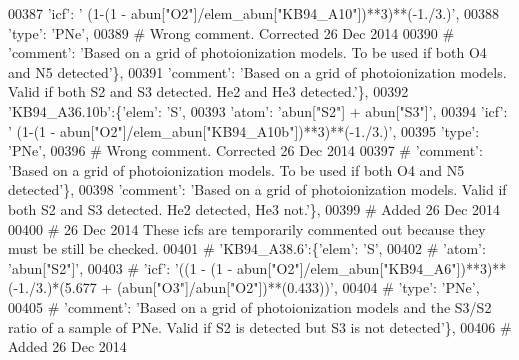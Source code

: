 \begin{DoxyCode}
00387                                      \textcolor{stringliteral}{'icf'}: \textcolor{stringliteral}{' (1-(1 - abun["O2"]/elem\_abun["KB94\_A10"])**3)**(-1./3.)'},
00388                                       \textcolor{stringliteral}{'type'}: \textcolor{stringliteral}{'PNe'},
00389 \textcolor{comment}{# Wrong comment. Corrected 26 Dec 2014}
00390 \textcolor{comment}{#                                      'comment': 'Based on a grid of photoionization models. To be used if
       both O4 and N5 detected'\},}
00391                                       \textcolor{stringliteral}{'comment'}: \textcolor{stringliteral}{'Based on a grid of photoionization models. Valid if both
       S2 and S3 detected. He2 and He3 detected.'}\},
00392                          \textcolor{stringliteral}{'KB94\_A36.10b'}:\{\textcolor{stringliteral}{'elem'}: \textcolor{stringliteral}{'S'},
00393                                      \textcolor{stringliteral}{'atom'}: \textcolor{stringliteral}{'abun["S2"] + abun["S3"]'},
00394                                      \textcolor{stringliteral}{'icf'}: \textcolor{stringliteral}{' (1-(1 - abun["O2"]/elem\_abun["KB94\_A10b"])**3)**(-1./3.)'},
00395                                       \textcolor{stringliteral}{'type'}: \textcolor{stringliteral}{'PNe'},
00396 \textcolor{comment}{# Wrong comment. Corrected 26 Dec 2014}
00397 \textcolor{comment}{#                                      'comment': 'Based on a grid of photoionization models. To be used if
       both O4 and N5 detected'\},}
00398                                       \textcolor{stringliteral}{'comment'}: \textcolor{stringliteral}{'Based on a grid of photoionization models. Valid if both
       S2 and S3 detected. He2 detected, He3 not.'}\},
00399 \textcolor{comment}{# Added 26 Dec 2014}
00400 \textcolor{comment}{# 26 Dec 2014 These icfs are temporarily commented out because they must be still be checked. }
00401 \textcolor{comment}{#                         'KB94\_A38.6':\{'elem': 'S',}
00402 \textcolor{comment}{#                                     'atom': 'abun["S2"]',}
00403 \textcolor{comment}{#                                     'icf': '((1 - (1 -
       abun["O2"]/elem\_abun["KB94\_A6"])**3)**(-1./3.)*(5.677 + (abun["O3"]/abun["O2"])**(0.433))',}
00404 \textcolor{comment}{#                                      'type': 'PNe',}
00405 \textcolor{comment}{#                                      'comment': 'Based on a grid of photoionization models and the S3/S2
       ratio of a sample of PNe. Valid if S2 is detected but S3 is not detected'\},}
00406 \textcolor{comment}{# Added 26 Dec 2014}

\end{DoxyCode}
